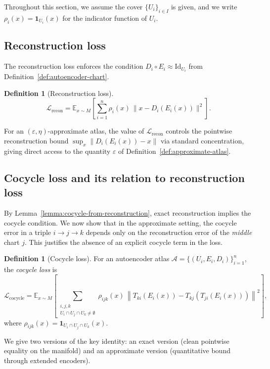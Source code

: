 \documentclass[11pt]{article}
\theoremstyle{plain}
\theoremstyle{definition}
\newtheorem{definition}[theorem]{Definition}
\theoremstyle{remark}
\begin{document}
Throughout this section, we assume the cover $\{U_i\}_{i \in I}$ is given, and we write $\rho_i(x) = \mathbf{1}_{U_i}(x)$ for the indicator function of $U_i$.

\subsection*{Reconstruction loss}

The reconstruction loss enforces the condition $D_i \circ E_i \approx \mathrm{Id}_{U_i}$ from Definition~\ref{def:autoencoder-chart}.

\begin{definition}[Reconstruction loss]\label{def:recon-loss}
\[
\mathcal{L}_{\mathrm{recon}} = \mathbb{E}_{x \sim M}\left[ \sum_{i=1}^{n} \rho_i(x)\, \| x - D_i(E_i(x)) \|^2 \right].
\]
\end{definition}

For an $(\varepsilon, \eta)$-approximate atlas, the value of $\mathcal{L}_{\mathrm{recon}}$ controls the pointwise reconstruction bound $\sup_x \|D_i(E_i(x)) - x\|$ via standard concentration, giving direct access to the quantity $\varepsilon$ of Definition~\ref{def:approximate-atlas}.

\subsection*{Cocycle loss and its relation to reconstruction loss}\label{subsec:cocycle-loss}

By Lemma~\ref{lemma:cocycle-from-reconstruction}, exact reconstruction implies the cocycle condition. We now show that in the approximate setting, the cocycle error in a triple $i \to j \to k$ depends only on the reconstruction error of the \emph{middle} chart $j$. This justifies the absence of an explicit cocycle term in the loss.

\begin{definition}[Cocycle loss]\label{def:cocycle-loss}
For an autoencoder atlas $\mathcal{A} = \{(U_i, E_i, D_i)\}_{i=1}^n$, the \emph{cocycle loss} is
\[
\mathcal{L}_{\mathrm{cocycle}} = \mathbb{E}_{x \sim M}\left[ \sum_{\substack{i,j,k \\ U_i \cap U_j \cap U_k \neq \emptyset}} \rho_{ijk}(x)\, \left\| T_{ki}(E_i(x)) - T_{kj}(T_{ji}(E_i(x))) \right\|^2 \right],
\]
where $\rho_{ijk}(x) = \mathbf{1}_{U_i \cap U_j \cap U_k}(x)$.
\end{definition}

We give two versions of the key identity: an exact version (clean pointwise equality on the manifold) and an approximate version (quantitative bound through extended encoders).
\end{document}
